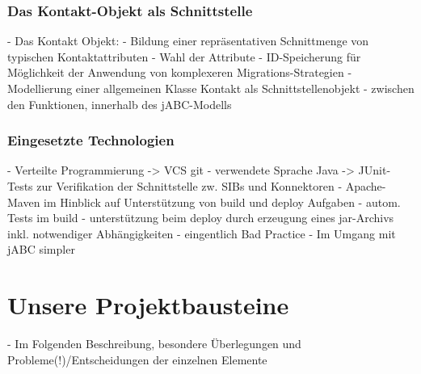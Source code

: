 \subsubsection{Das Kontakt-Objekt als Schnittstelle}
- Das Kontakt Objekt:
	- Bildung einer repräsentativen Schnittmenge von typischen Kontaktattributen
		- Wahl der Attribute
		- ID-Speicherung für Möglichkeit der Anwendung von komplexeren Migrations-Strategien
	- Modellierung einer allgemeinen Klasse Kontakt als Schnittstellenobjekt
		- zwischen den Funktionen, innerhalb des jABC-Modells
		
\subsubsection{Eingesetzte Technologien}
- Verteilte Programmierung -> VCS git
- verwendete Sprache Java -> JUnit-Tests zur Verifikation der Schnittstelle zw. SIBs und Konnektoren
- Apache-Maven im Hinblick auf Unterstützung von build und deploy Aufgaben
	- autom. Tests im build
	- unterstützung beim deploy durch erzeugung eines jar-Archivs inkl. notwendiger Abhängigkeiten
		- eingentlich Bad Practice
		- Im Umgang mit jABC simpler


\section{Unsere Projektbausteine}
 - Im Folgenden Beschreibung, besondere Überlegungen und Probleme(!)/Entscheidungen der einzelnen Elemente

